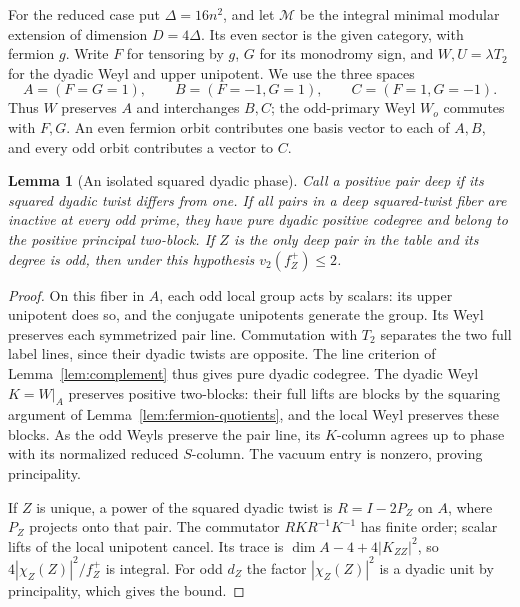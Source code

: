 \documentclass[11pt,a4paper]{article}
\numberwithin{equation}{section}
\newtheorem{lemma}[theorem]{Lemma}
\theoremstyle{remark}
\newcommand{\M}{\mathcal M}
\begin{document}
For the reduced case put $\Delta=16n^2$, and let $\M$ be the
integral minimal modular extension of dimension $D=4\Delta$.
Its even sector is the given category, with fermion $g$. Write $F$
for tensoring by $g$, $G$ for its monodromy sign, and $W,U=\lambda
T_2$ for the dyadic Weyl and upper unipotent. We use the three spaces
\[
 A=(F=G=1),\qquad B=(F=-1,G=1),\qquad C=(F=1,G=-1).
\]
Thus $W$ preserves $A$ and interchanges $B,C$; the odd-primary
Weyl $W_o$ commutes with $F,G$. An even fermion orbit contributes
one basis vector to each of $A,B$, and every odd orbit contributes
a vector to $C$.

\begin{lemma}[An isolated squared dyadic phase]\label{short:deep-pair}
Call a positive pair deep if its squared dyadic twist differs from one.
If all pairs in a deep squared-twist fiber are inactive at every odd
prime, they have pure dyadic positive codegree and belong to the
positive principal two-block. If $Z$ is the only deep pair in the
table and its degree is odd, then under this hypothesis
$v_2(f_Z^+)\le2$.
\end{lemma}
\begin{proof}
On this fiber in $A$, each odd local group acts by scalars: its
upper unipotent does so, and the conjugate unipotents generate the
group. Its Weyl preserves each symmetrized pair line. Commutation
with $T_2$ separates the two full label lines, since their dyadic
twists are opposite. The line criterion of Lemma~\ref{lem:complement}
thus gives pure dyadic codegree.
The dyadic Weyl $K=W|_A$ preserves positive two-blocks: their full
lifts are blocks by the squaring argument of
Lemma~\ref{lem:fermion-quotients}, and the local Weyl preserves
these blocks. As the odd Weyls preserve the pair line, its $K$-column
agrees up to phase with its normalized reduced $S$-column. The
vacuum entry is nonzero, proving principality.

If $Z$ is unique, a power of the squared dyadic twist is
$R=I-2P_Z$ on $A$, where $P_Z$ projects onto that pair.
The commutator $RKR^{-1}K^{-1}$ has finite order; scalar lifts of
the local unipotent cancel. Its trace is
$\dim A-4+4|K_{ZZ}|^2$, so $4|\chi_Z(Z)|^2/f_Z^+$ is integral.
For odd $d_Z$ the factor $|\chi_Z(Z)|^2$ is a dyadic unit by
principality, which gives the bound.
\end{proof}
\end{document}
